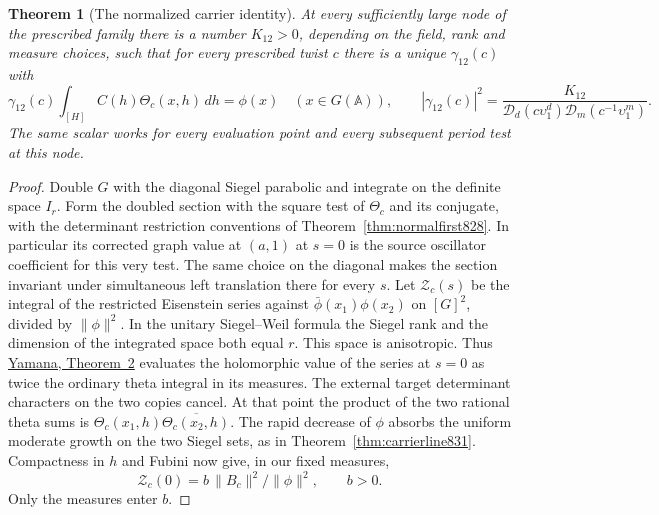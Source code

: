 \documentclass[a4paper,11pt]{article}
\newtheorem{theorem}[proposition]{Theorem}
\theoremstyle{definition}
\theoremstyle{remark}
\numberwithin{equation}{section}
\begin{document}
\begin{theorem}[The normalized carrier identity]
\leavevmode\label{thm:secondglobal833}
At every sufficiently large node of the prescribed family
there is a number \(K_{12}>0\), depending on the field,
rank and measure choices, such that for every prescribed
twist \(c\) there is a unique \(\gamma_{12}(c)\) with
\[
 \gamma_{12}(c)\int_{[H]}C(h)\Theta_c(x,h)\,dh=\phi(x)
           \quad(x\in G(\mathbb A)),\qquad
 |\gamma_{12}(c)|^2
  =\frac{K_{12}}{\mathcal D_d(c\upsilon_1^d)
                      \mathcal D_m(c^{-1}\upsilon_1^m)}.
\]
The same scalar works for every evaluation point and every
subsequent period test at this node.
\end{theorem}
\begin{proof}
Double \(G\) with the diagonal Siegel parabolic and integrate
on the definite space \(I_r\). Form the doubled section with
the square test of \(\Theta_c\) and its conjugate, with the
determinant restriction conventions of
Theorem~\ref{thm:normalfirst828}. In particular its corrected
graph value at \((a,1)\) at \(s=0\) is the source oscillator
coefficient for this very test. The same choice on the
diagonal makes the section invariant under simultaneous left
translation there for every \(s\). Let \(\mathcal Z_c(s)\)
be the integral of the restricted Eisenstein series against
\(\bar\phi(x_1)\phi(x_2)\) on \([G]^2\), divided by
\(\|\phi\|^2\). In the unitary Siegel--Weil formula the
Siegel rank and the dimension of the integrated space both
equal \(r\). This space is anisotropic. Thus
\href{https://msp.org/pjm/2013/264-1/pjm-v264-n1-p11-s.pdf}
{Yamana, Theorem~2} evaluates the holomorphic value of the
series at \(s=0\) as twice the ordinary theta integral in
its measures. The external target determinant characters on
the two copies cancel. At that point the product of the two
rational theta sums is
\(\Theta_c(x_1,h)\overline{\Theta_c(x_2,h)}\).
The rapid decrease of \(\phi\) absorbs the uniform moderate
growth on the two Siegel sets, as in
Theorem~\ref{thm:carrierline831}. Compactness in \(h\) and
Fubini now give, in our fixed measures,
\[
             \mathcal Z_c(0)=b\,\|B_c\|^2/\|\phi\|^2,\qquad b>0 .
\]
Only the measures enter \(b\).


\end{proof}
\end{document}
